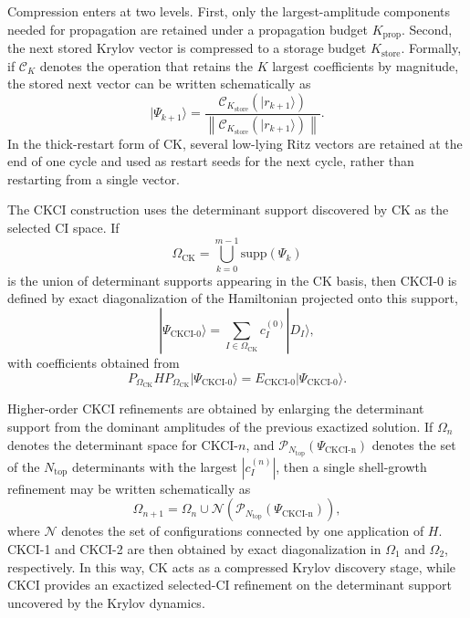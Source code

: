 Compression enters at two levels. First, only the largest-amplitude components
needed for propagation are retained under a propagation budget
$K_{\mathrm{prop}}$. Second, the next stored Krylov vector is compressed to a
storage budget $K_{\mathrm{store}}$. Formally, if $\mathcal{C}_{K}$ denotes the
operation that retains the $K$ largest coefficients by magnitude, the stored
next vector can be written schematically as
\begin{equation}
|\Psi_{k+1}\rangle =
\frac{\mathcal{C}_{K_{\mathrm{store}}}\!\left(|r_{k+1}\rangle\right)}
{\left\|\mathcal{C}_{K_{\mathrm{store}}}\!\left(|r_{k+1}\rangle\right)\right\|}.
\end{equation}
In the thick-restart form of CK, several low-lying Ritz vectors are retained at
the end of one cycle and used as restart seeds for the next cycle, rather than
restarting from a single vector.

The CKCI construction uses the determinant support discovered by CK as the
selected CI space. If
\begin{equation}
\Omega_{\mathrm{CK}} = \bigcup_{k=0}^{m-1} \mathrm{supp}(\Psi_k)
\end{equation}
is the union of determinant supports appearing in the CK basis, then CKCI-0 is
defined by exact diagonalization of the Hamiltonian projected onto this support,
\begin{equation}
|\Psi_{\mathrm{CKCI\mbox{-}0}}\rangle
= \sum_{I \in \Omega_{\mathrm{CK}}} c_I^{(0)} |D_I\rangle,
\end{equation}
with coefficients obtained from
\begin{equation}
P_{\Omega_{\mathrm{CK}}} H P_{\Omega_{\mathrm{CK}}}
|\Psi_{\mathrm{CKCI\mbox{-}0}}\rangle
= E_{\mathrm{CKCI\mbox{-}0}}
|\Psi_{\mathrm{CKCI\mbox{-}0}}\rangle.
\end{equation}

Higher-order CKCI refinements are obtained by enlarging the determinant support
from the dominant amplitudes of the previous exactized solution. If
$\Omega_n$ denotes the determinant space for CKCI-$n$, and
$\mathcal{P}_{N_{\mathrm{top}}}(\Psi_{\mathrm{CKCI\mbox{-}n}})$ denotes the set
of the $N_{\mathrm{top}}$ determinants with the largest $|c_I^{(n)}|$, then a
single shell-growth refinement may be written schematically as
\begin{equation}
\Omega_{n+1}
=
\Omega_n \cup \mathcal{N}\!\left(
\mathcal{P}_{N_{\mathrm{top}}}
(\Psi_{\mathrm{CKCI\mbox{-}n}})
\right),
\end{equation}
where $\mathcal{N}$ denotes the set of configurations connected by one
application of $H$. CKCI-1 and CKCI-2 are then obtained by exact
diagonalization in $\Omega_1$ and $\Omega_2$, respectively. In this way, CK
acts as a compressed Krylov discovery stage, while CKCI provides an exactized
selected-CI refinement on the determinant support uncovered by the Krylov
dynamics.
